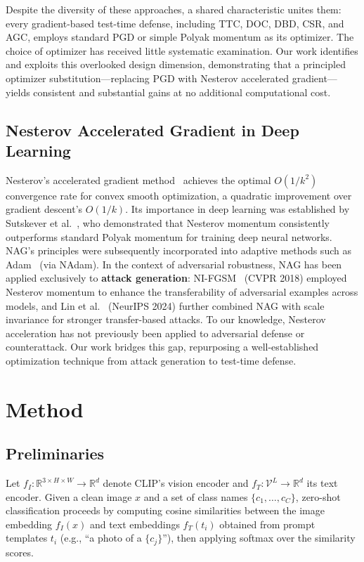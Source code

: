 \documentclass[pdflatex,sn-basic,Numbered]{sn-jnl}
\theoremstyle{thmstyleone}
\theoremstyle{thmstyletwo}
\theoremstyle{thmstylethree}
\begin{document}
Despite the diversity of these approaches, a shared characteristic unites them: every gradient-based test-time defense, including TTC, DOC, DBD, CSR, and AGC, employs standard PGD or simple Polyak momentum as its optimizer. The choice of optimizer has received little systematic examination. Our work identifies and exploits this overlooked design dimension, demonstrating that a principled optimizer substitution---replacing PGD with Nesterov accelerated gradient---yields consistent and substantial gains at no additional computational cost.

\subsection{Nesterov Accelerated Gradient in Deep Learning}

Nesterov's accelerated gradient method~\cite{nesterov1983method} achieves the optimal $O(1/k^2)$ convergence rate for convex smooth optimization, a quadratic improvement over gradient descent's $O(1/k)$. Its importance in deep learning was established by Sutskever et al.~\cite{sutskever2013importance}, who demonstrated that Nesterov momentum consistently outperforms standard Polyak momentum for training deep neural networks. NAG's principles were subsequently incorporated into adaptive methods such as Adam~\cite{kingma2015adam} (via NAdam). In the context of adversarial robustness, NAG has been applied exclusively to \textbf{attack generation}: NI-FGSM~\cite{dong2018boosting} (CVPR 2018) employed Nesterov momentum to enhance the transferability of adversarial examples across models, and Lin et al.~\cite{lin2024nesterov} (NeurIPS 2024) further combined NAG with scale invariance for stronger transfer-based attacks. To our knowledge, Nesterov acceleration has not previously been applied to adversarial defense or counterattack. Our work bridges this gap, repurposing a well-established optimization technique from attack generation to test-time defense.

\section{Method}\label{sec:method}

\subsection{Preliminaries}

Let $f_I: \mathbb{R}^{3 \times H \times W} \to \mathbb{R}^d$ denote CLIP's vision encoder and $f_T: \mathcal{V}^L \to \mathbb{R}^d$ its text encoder. Given a clean image $x$ and a set of class names $\{c_1, \dots, c_C\}$, zero-shot classification proceeds by computing cosine similarities between the image embedding $f_I(x)$ and text embeddings $f_T(t_i)$ obtained from prompt templates $t_i$ (e.g., ``a photo of a $\{c_j\}$''), then applying softmax over the similarity scores.
\end{document}
